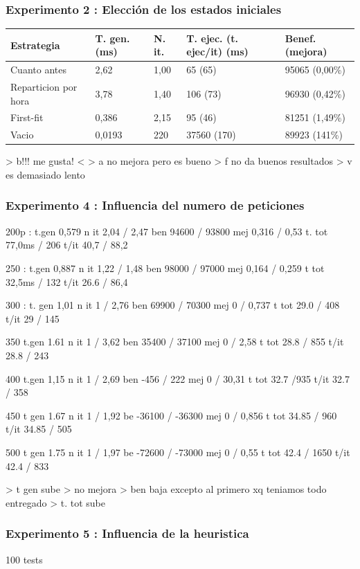 \documentclass{article}
\begin{document}
\subsubsection{Experimento 2 : Elección de los estados iniciales}
\begin{tabular}{|l|l|l|l|l|}
\hline
Estrategia & T. gen. (ms) & N. it. & T. ejec. (t. ejec/it) (ms) & Benef.
(mejora)\\
\hline
Cuanto antes & 2,62 & 1,00 & 65 (65) & 95065 (0,00\%)\\
\hline
Reparticion por hora & 3,78 & 1,40 & 106 (73) & 96930 (0,42\%)\\
\hline
First-fit & 0,386 & 2,15 & 95 (46) & 81251 (1,49\%)\\
\hline
Vacio & 0,0193 & 220 & 37560 (170) & 89923 (141\%)\\
\hline
\end{tabular}

> b!!! me gusta! <
> a no mejora pero es bueno
> f no da buenos resultados
> v es demasiado lento

\subsubsection{Experimento 4 : Influencia del numero de peticiones}
200p : 
t.gen 0,579
n it 2,04 / 2,47
ben 94600 / 93800
mej 0,316 / 0,53
t. tot 77,0ms / 206
t/it 40,7 / 88,2

250 :
t.gen 0,887
n it 1,22 / 1,48
ben 98000 / 97000
mej 0,164 / 0,259
t tot 32,5ms / 132
t/it 26.6 / 86,4

300 :
t. gen 1,01
n it 1 / 2,76
ben 69900 / 70300
mej 0 / 0,737
t tot 29.0 / 408
t/it 29 / 145

350
t.gen 1.61
n it 1 / 3,62
ben 35400 / 37100
mej 0 / 2,58
t tot 28.8 / 855
t/it 28.8 / 243

400
t.gen 1,15
n it 1 / 2,69
ben -456 / 222
mej 0 / 30,31
t tot 32.7 /935
t/it 32.7 / 358

450
t gen 1.67
n it 1 / 1,92
be -36100 / -36300
mej 0 / 0,856
t tot 34.85 / 960
t/it 34.85 / 505

500
t gen 1.75
n it 1 / 1,97
be -72600 / -73000
mej 0 / 0,55
t tot 42.4 / 1650
t/it 42.4 / 833

> t gen sube
> no mejora
> ben baja excepto al primero xq teniamos todo entregado
> t. tot sube 

\subsubsection{Experimento 5 : Influencia de la heuristica}
100 tests
\end{document}
